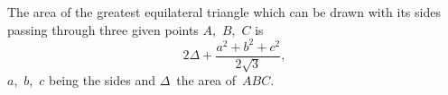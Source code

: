 The area of the greatest equilateral triangle which can be drawn
with its sides passing through three given points $A$,~$B$,~$C$ is
\[
2\Delta + \frac{a^{2} + b^{2} + c^{2}}{2\sqrt{3}},
\]
$a$,~$b$,~$c$ being the sides and $\Delta$~the area of~$ABC$. 

